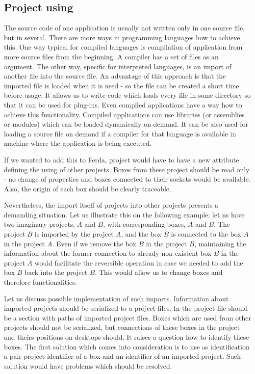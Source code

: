 \documentclass[a4paper,12pt]{book}
\begin{document}
\subsection{Project using}
The source code of one application is usually not written only in one source file, but in several. There are more ways in programming languages how to achieve this. One way typical for compiled languages is compilation of application from more source files from the beginning. A compiler has a set of files as an argument. The other way, specific for interpreted languages, is an import of another file into the source file. An advantage of this approach is that the imported file is loaded when it is used - so the file can be created a short time before usage. It allows us to write code which loads every file in some directory so that it can be used for plug-ins. Even compiled applications have a way how to achieve this functionality. Compiled applications can use libraries (or assemblies or modules) which can be loaded dynamically on demand. It can be also used for loading a source file on demand if a compiler for that language is available in machine where the application is being executed.

If we wanted to add this to Ferda, project would have to have a new attribute defining the using of other projects. Boxes from these project should be read only - no change of properties and boxes connected to their sockets would be available. Also, the origin of each box should be clearly traceable.

Nevertheless, the import itself of projects into other projects presents a demanding situation. Let us illustrate this on the following example: let us have two imaginary projects, $A$ and $B$, with corresponding boxes, $A$ and $B$. The project $B$ is imported by the project $A$, and the box $B$ is connected to the box $A$ in the project $A$. Even if we remove the box $B$ in the project $B$, maintaining the information about the former connection to already non-existent box $B$ in the project $A$ would facilitate the reversible operation in case we needed to add the box $B$ back into the project $B$. This would allow us to change boxes and therefore functionalities.

Let us discuss possible implementation of such imports. Information about imported projects should be serialized to a project files. In the project file should be a section with paths of imported project files. Boxes which are used from other projects should not be serialized, but connections of these boxes in the project and theirs positions on desktops should. It raises a question how to identify these boxes. The first solution which comes into consideration is to use as identification a pair project identifier of a box and an identifier of an imported project. Such solution would have problems which should be resolved.
\end{document}
